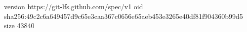 version https://git-lfs.github.com/spec/v1
oid sha256:49c2c6a649457d9c65e3caa367c0656e65aeb453e3265e40df81f904360b99d5
size 43840
